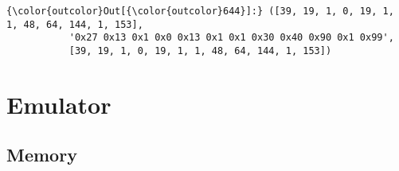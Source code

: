 \documentclass[11pt]{article}
\begin{document}
\begin{Verbatim}[commandchars=\\\{\}]
{\color{outcolor}Out[{\color{outcolor}644}]:} ([39, 19, 1, 0, 19, 1, 1, 48, 64, 144, 1, 153],
           '0x27 0x13 0x1 0x0 0x13 0x1 0x1 0x30 0x40 0x90 0x1 0x99',
           [39, 19, 1, 0, 19, 1, 1, 48, 64, 144, 1, 153])
\end{Verbatim}
            
    \hypertarget{emulator}{%
\section{Emulator}\label{emulator}}

    \hypertarget{memory}{%
\subsection{Memory}\label{memory}}
\end{document}
